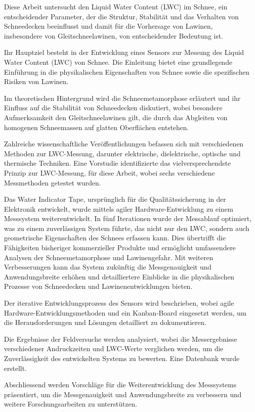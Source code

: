 Diese Arbeit untersucht den Liquid Water Content (LWC) im Schnee, ein entscheidender Parameter, der die Struktur, Stabilität und das Verhalten von Schneedecken beeinflusst und damit für die Vorhersage von Lawinen, insbesondere von Gleitschneelawinen, von entscheidender Bedeutung ist.

Ihr Hauptziel besteht in der Entwicklung eines Sensors zur Messung des Liquid Water Content (LWC) von Schnee. Die Einleitung bietet eine grundlegende Einführung in die physikalischen Eigenschaften von Schnee sowie die spezifischen Risiken von Lawinen.

Im theoretischen Hintergrund wird die Schneemetamorphose erläutert und ihr Einfluss auf die Stabilität von Schneedecken diskutiert, wobei besondere Aufmerksamkeit den Gleitschneelawinen gilt, die durch das Abgleiten von homogenen Schneemassen auf glatten Oberflächen entstehen.

Zahlreiche wissenschaftliche Veröffentlichungen befassen sich mit verschiedenen Methoden zur LWC-Messung, darunter elektrische, dielektrische, optische und thermische Techniken. Eine Vorstudie identifizierte das vielversprechendste Prinzip zur LWC-Messung, für diese Arbeit, wobei sechs verschiedene Messmethoden getestet wurden.

Das Water Indicator Tape, ursprünglich für die Qualitätssicherung in der Elektronik entwickelt, wurde mittels agiler Hardware-Entwicklung zu einem Messsystem weiterentwickelt. In fünf Iterationen wurde der Messablauf optimiert, was zu einem zuverlässigen System führte, das nicht nur den LWC, sondern auch geometrische Eigenschaften des Schnees erfassen kann. Dies übertrifft die Fähigkeiten bisheriger kommerzieller Produkte und ermöglicht umfassendere Analysen der Schneemetamorphose und Lawinengefahr. Mit weiteren Verbesserungen kann das System zukünftig die Messgenauigkeit und Anwendungsbreite erhöhen und detailliertere Einblicke in die physikalischen Prozesse von Schneedecken und Lawinenentwicklungen bieten.

Der iterative Entwicklungsprozess des Sensors wird beschrieben, wobei agile Hardware-Entwicklungsmethoden und ein Kanban-Board eingesetzt werden, um die Herausforderungen und Lösungen detailliert zu dokumentieren.

Die Ergebnisse der Feldversuche werden analysiert, wobei die Messergebnisse verschiedener Andruckzeiten und LWC-Werte verglichen werden, um die Zuverlässigkeit des entwickelten Systems zu bewerten. Eine Datenbank wurde erstellt.

Abschliessend werden Vorschläge für die Weiterentwicklung des Messsystems präsentiert, um die Messgenauigkeit und Anwendungsbreite zu verbessern und weitere Forschungsarbeiten zu unterstützen.
